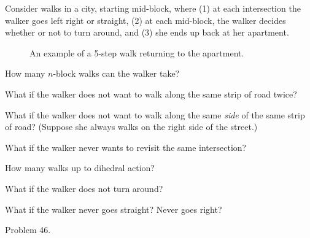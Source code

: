 \documentclass{article}
\begin{document}
  Consider walks in a city, starting mid-block, where (1) at each intersection
  the walker goes left right or straight, (2) at each mid-block, the walker
  decides whether or not to turn around, and (3) she ends up back at her
  apartment.
  \begin{figure}[!h]
    \centering
    \caption{
      An example of a 5-step walk returning to the apartment.
    }
  \end{figure}

\begin{question}
  How many $n$-block walks can the walker take?
\end{question}
\begin{related}
  \item What if the walker does not want to walk along the same strip of road
    twice?
  \item What if the walker does not want to walk along the same \textit{side} of
    the same strip of road? (Suppose she always walks on the right side of the
    street.)
  \item What if the walker never wants to revisit the same intersection?
  \item How many walks up to dihedral action?
  \item What if the walker does not turn around?
  \item What if the walker never goes straight? Never goes right?
\end{related}
\begin{references}
  \item Problem 46.
\end{references}
\end{document}
